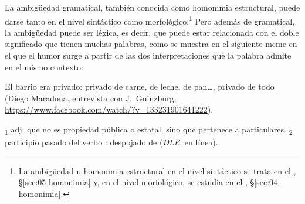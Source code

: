La ambigüedad gramatical, también conocida como homonimia estructural, puede
darse tanto en el nivel sintáctico como morfológico.\footnote{La ambigüedad u
homonimia estructural en el nivel sintáctico se trata en el , §\ref{sec:05-homonimia} y,
en el nivel morfológico, se estudia en el , §\ref{sec:04-homonimia}.} Pero además de
gramatical, la ambigüedad puede ser léxica, es decir, que puede estar
relacionada con el doble significado que tienen muchas palabras, como se
muestra en el siguiente meme en el que el humor surge a partir de las dos
interpretaciones que la palabra  admite en el mismo contexto:

\begin{exe}
  \ex\label{ex:02-privado} El barrio era privado: privado de carne, de leche, de
      pan\ldots, privado de todo (Diego Maradona, entrevista con J.~Guinzburg,
      \url{https://www.facebook.com/watch/?v=133231901641222}).
    \begin{xlist}
      \ex {}\textsubscript{1} adj. que no es propiedad pública o
          estatal, sino que pertenece a particulares.
      \ex {}\textsubscript{2} participio pasado del verbo
          : despojado de (\textit{DLE}, en línea).
    \end{xlist}
\end{exe}

